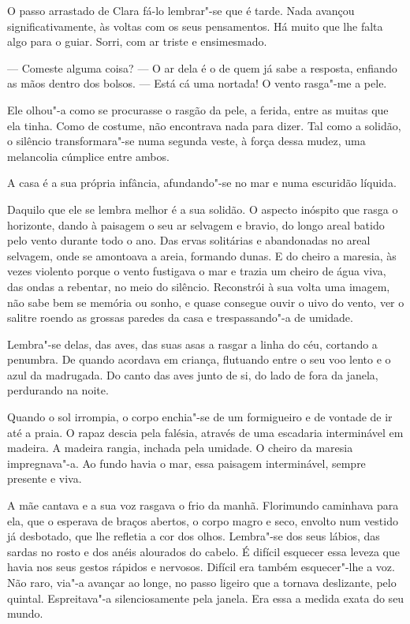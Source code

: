 O passo arrastado de Clara fá-lo lembrar"-se que é tarde. Nada avançou
significativamente, às voltas com os seus pensamentos. Há muito que lhe
falta algo para o guiar. Sorri, com ar triste e ensimesmado.

--- Comeste alguma coisa? --- O ar dela é o de quem já sabe a resposta,
enfiando as mãos dentro dos bolsos. --- Está cá uma nortada! O vento
rasga"-me a pele.

Ele olhou"-a como se procurasse o rasgão da pele, a ferida, entre as
muitas que ela tinha. Como de costume, não encontrava nada para dizer.
Tal como a solidão, o silêncio transformara"-se numa segunda veste, à
força dessa mudez, uma melancolia cúmplice entre ambos.

A casa é a sua própria infância, afundando"-se no mar e numa escuridão
líquida.

Daquilo que ele se lembra melhor é a sua solidão. O aspecto inóspito que
rasga o horizonte, dando à paisagem o seu ar selvagem e bravio, do longo
areal batido pelo vento durante todo o ano. Das ervas solitárias e
abandonadas no areal selvagem, onde se amontoava a areia, formando
dunas. E do cheiro a maresia, às vezes violento porque o vento fustigava
o mar e trazia um cheiro de água viva, das ondas a rebentar, no meio do
silêncio. Reconstrói à sua volta uma imagem, não sabe bem se memória ou
sonho, e quase consegue ouvir o uivo do vento, ver o salitre roendo as
grossas paredes da casa e trespassando"-a de umidade.

Lembra"-se delas, das aves, das suas asas a rasgar a linha do céu,
cortando a penumbra. De quando acordava em criança, flutuando entre o
seu voo lento e o azul da madrugada. Do canto das aves junto de si, do
lado de fora da janela, perdurando na noite.

Quando o sol irrompia, o corpo enchia"-se de um formigueiro e de vontade
de ir até a praia. O rapaz descia pela falésia, através de uma escadaria
interminável em madeira. A madeira rangia, inchada pela umidade. O
cheiro da maresia impregnava"-a. Ao fundo havia o mar, essa paisagem
interminável, sempre presente e viva.

A mãe cantava e a sua voz rasgava o frio da manhã. Florimundo caminhava
para ela, que o esperava de braços abertos, o corpo magro e seco,
envolto num vestido já desbotado, que lhe refletia a cor dos olhos.
Lembra"-se dos seus lábios, das sardas no rosto e dos anéis alourados do
cabelo. É difícil esquecer essa leveza que havia nos seus gestos rápidos
e nervosos. Difícil era também esquecer"-lhe a voz. Não raro, via"-a
avançar ao longe, no passo ligeiro que a tornava deslizante, pelo
quintal. Espreitava"-a silenciosamente pela janela. Era essa a medida
exata do seu mundo.

